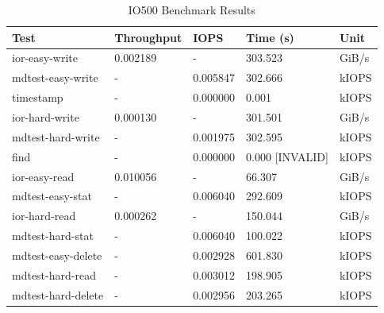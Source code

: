 \documentclass[article,a4paper,12pt,brazil,sumario=tradicional]{abntex2}
\begin{document}
\begin{table}[htb]
	\centering
	\begin{tabular}{|l|l|l|l|l|}
		\hline
		\rowcolor[HTML]{EFEFEF}
		\textbf{Test}          & \textbf{Throughput}        & \textbf{IOPS}         & \textbf{Time (s)} & \textbf{Unit} \\ \hline
		ior-easy-write         & 0.002189                    & -                    & 303.523           & GiB/s         \\ \hline
		mdtest-easy-write      & -                          & 0.005847             & 302.666           & kIOPS         \\ \hline
		timestamp              & -                          & 0.000000             & 0.001             & kIOPS         \\ \hline
		ior-hard-write         & 0.000130                    & -                    & 301.501           & GiB/s         \\ \hline
		mdtest-hard-write      & -                          & 0.001975             & 302.595           & kIOPS         \\ \hline
		find                   & -                          & 0.000000             & 0.000 [INVALID]   & kIOPS         \\ \hline
		ior-easy-read          & 0.010056                    & -                    & 66.307            & GiB/s         \\ \hline
		mdtest-easy-stat       & -                          & 0.006040             & 292.609           & kIOPS         \\ \hline
		ior-hard-read          & 0.000262                    & -                    & 150.044           & GiB/s         \\ \hline
		mdtest-hard-stat       & -                          & 0.006040             & 100.022           & kIOPS         \\ \hline
		mdtest-easy-delete     & -                          & 0.002928             & 601.830           & kIOPS         \\ \hline
		mdtest-hard-read       & -                          & 0.003012             & 198.905           & kIOPS         \\ \hline
		mdtest-hard-delete     & -                          & 0.002956             & 203.265           & kIOPS         \\ \hline
	\end{tabular}
	\caption{IO500 Benchmark Results}
	\label{tab:io500-results}
\end{table}
\end{document}
